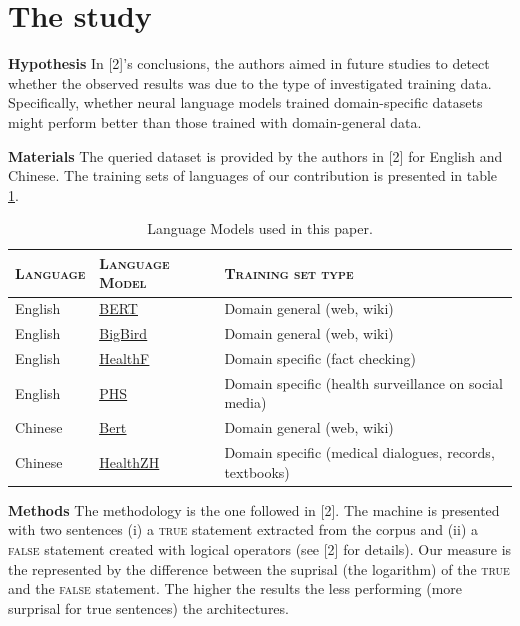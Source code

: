 \documentclass{IOS-Book-Article}
\begin{document}
\section{The study}
\textbf{Hypothesis} In [2]'s conclusions, the authors aimed in future studies to detect whether the observed results was due to the type of investigated training data. Specifically, whether neural language models trained domain-specific datasets might perform better than those trained with domain-general data.

\noindent \textbf{Materials} The queried dataset is provided by the authors in [2] for English and Chinese. The training sets of languages of our contribution is presented in table \ref{models}.

\begin{table}[]
    \centering
    \begin{tabular}{l|l|l}
         \textsc{Language} & \textsc{Language Model} & \textsc{Training set type}\\ \hline
         English & \href{https://huggingface.co/docs/transformers/model_doc/bert}{\underline{BERT}} & Domain general (web, wiki)\\
         English & \href{https://huggingface.co/docs/transformers/model_doc/big_bird}{\underline{BigBird}} & Domain general (web, wiki)\\
         English & \href{https://huggingface.co/austinmw/distilbert-base-uncased-finetuned-health_facts}{\underline{HealthF}} & Domain specific (fact checking)\\
         English & \href{https://huggingface.co/publichealthsurveillance/PHS-BERT}{\underline{PHS}} & Domain specific (health surveillance on social media)\\
         Chinese & \href{https://huggingface.co/bert-base-chinese}{\underline{Bert}} & Domain general (web, wiki)\\
         Chinese & \href{https://huggingface.co/nghuyong/ernie-health-zh}{\underline{HealthZH}} & Domain specific (medical dialogues, records, textbooks)\\ \hline
    \end{tabular}
    \caption{Language Models used in this paper.}
    \label{models}
\end{table}

\noindent \textbf{Methods} The methodology is the one followed in [2]. The machine is presented with two sentences (i) a \textsc{true} statement extracted from the corpus and (ii) a \textsc{false} statement created with logical operators (see [2] for details). Our measure is the represented by the difference between the suprisal (the logarithm) of the \textsc{true} and the \textsc{false} statement. The higher the results the less performing (more surprisal for true sentences) the architectures.
\end{document}
